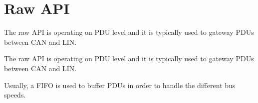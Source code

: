 \hypertarget{group__raw__api__group}{}\section{Raw A\+P\+I}
\label{group__raw__api__group}


The raw A\+P\+I is operating on P\+D\+U level and it is typically used to gateway P\+D\+Us between C\+A\+N and L\+I\+N.  


The raw A\+P\+I is operating on P\+D\+U level and it is typically used to gateway P\+D\+Us between C\+A\+N and L\+I\+N. 

Usually, a F\+I\+F\+O is used to buffer P\+D\+Us in order to handle the different bus speeds. 